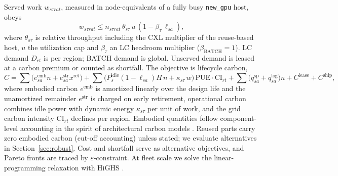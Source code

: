 \documentclass[11pt]{article}
\begin{document}
Served work $w_{s\tau rat}$, measured in node-equivalents of a fully busy \texttt{new\_gpu} host, obeys
\begin{equation}
w_{s\tau rat}\le n_{s\tau rat}\,\theta_{s\tau}\,u\,(1-\beta_\tau\,\ell_{sa}),
\label{eq:cap}
\end{equation}
where $\theta_{s\tau}$ is relative throughput including the CXL multiplier of the reuse-based host, $u$ the utilization cap and $\beta_\tau$ an LC headroom multiplier ($\beta_{\text{BATCH}}=1$). LC demand $D_{rt}$ is per region; BATCH demand is global. Unserved demand is leased at a carbon premium or counted as shortfall. The objective is lifecycle carbon,
\begin{equation}
C=\sum\Big(e^{\text{emb}}_{sa}n + e^{\text{str}}_{sa}x^{\text{ret}}\Big)+\sum\Big(P^{\text{idle}}_{s}(1-\ell_{sa})H\,n+\kappa_{s\tau}\,w\Big)\,\mathrm{PUE}\cdot\mathrm{CI}_{rt}+\sum\big(q^{\text{sp}}_{sa}+q^{\text{log}}_{sa}\big)n+C^{\text{lease}}+C^{\text{ship}},
\label{eq:obj}
\end{equation}
where embodied carbon $e^{\text{emb}}$ is amortized linearly over the design life and the unamortized remainder $e^{\text{str}}$ is charged on early retirement, operational carbon combines idle power with dynamic energy $\kappa_{s\tau}$ per unit of work, and the grid carbon intensity $\mathrm{CI}_{rt}$ declines per region. Embodied quantities follow component-level accounting in the spirit of architectural carbon models \citep{gupta2022act}. Reused parts carry zero embodied carbon (cut-off accounting) unless stated; we evaluate alternatives in Section~\ref{sec:robust}. Cost and shortfall serve as alternative objectives, and Pareto fronts are traced by $\varepsilon$-constraint. At fleet scale we solve the linear-programming relaxation with HiGHS \citep{huangfu2018highs}.
\end{document}
